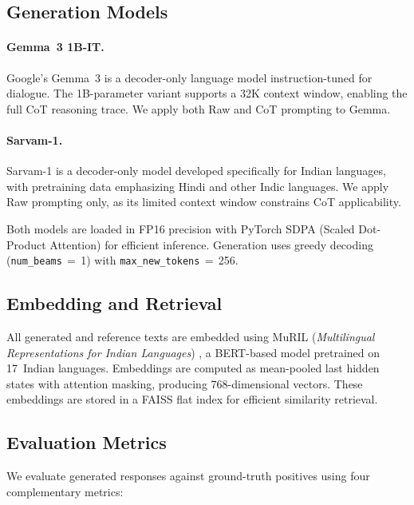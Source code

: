 \documentclass[11pt]{article}
\begin{document}
\subsection{Generation Models}
\label{subsec:models}

\paragraph{Gemma~3 1B-IT.}
Google's Gemma~3 \citep{gemma-team-2024} is a decoder-only language model instruction-tuned for dialogue. The 1B-parameter variant supports a 32K context window, enabling the full CoT reasoning trace. We apply both Raw and CoT prompting to Gemma.

\paragraph{Sarvam-1.}
Sarvam-1 \citep{sarvam-ai-2024} is a decoder-only model developed specifically for Indian languages, with pretraining data emphasizing Hindi and other Indic languages. We apply Raw prompting only, as its limited context window constrains CoT applicability.

Both models are loaded in FP16 precision with PyTorch SDPA (Scaled Dot-Product Attention) for efficient inference. Generation uses greedy decoding (\texttt{num\_beams}$\,{=}\,$1) with \texttt{max\_new\_tokens}$\,{=}\,$256.

\subsection{Embedding and Retrieval}
\label{subsec:embedding}

All generated and reference texts are embedded using MuRIL (\textit{Multilingual Representations for Indian Languages}) \citep{khanuja-etal-2021-muril}, a BERT-based model pretrained on 17~Indian languages. Embeddings are computed as mean-pooled last hidden states with attention masking, producing 768-dimensional vectors. These embeddings are stored in a FAISS \citep{johnson-etal-2019-faiss} flat index for efficient similarity retrieval.

\subsection{Evaluation Metrics}
\label{subsec:metrics}

We evaluate generated responses against ground-truth positives using four complementary metrics:
\end{document}
